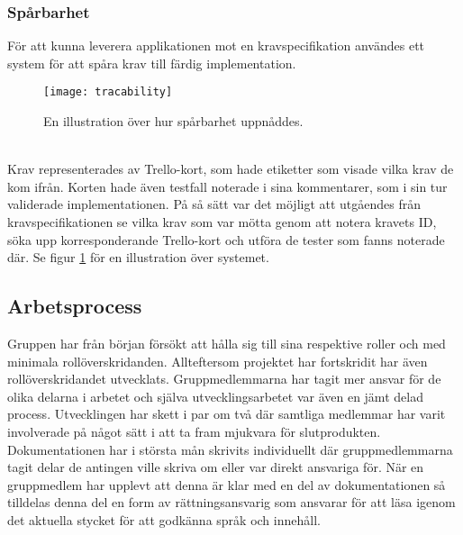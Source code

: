 \subsubsection{Spårbarhet}
För att kunna leverera applikationen mot en kravspecifikation
användes ett system för att spåra krav till färdig implementation.

\begin{figure}[h]
\centering
\texttt{[image: tracability]}
\caption{En illustration över hur spårbarhet uppnåddes.}
\label{fig:tracability}
\end{figure}
\ \\
Krav representerades av Trello-kort, som hade etiketter som visade vilka
krav de kom ifrån. Korten hade även testfall noterade i sina kommentarer, som i sin tur
validerade implementationen. På så sätt var det möjligt att utgåendes från kravspecifikationen se
vilka krav som var mötta genom att notera kravets ID, söka upp korresponderande Trello-kort och utföra
de tester som fanns noterade där. Se figur \ref{fig:tracability} för en illustration över systemet.

\subsection{Arbetsprocess}
Gruppen har från början försökt att hålla sig till sina respektive roller och med minimala rollöverskridanden. Allteftersom projektet har fortskridit har även rollöverskridandet utvecklats. Gruppmedlemmarna har tagit mer ansvar för de olika delarna i arbetet och själva utvecklingsarbetet var även en jämt delad process. Utvecklingen har skett i par om två där samtliga medlemmar har varit involverade på något sätt i att ta fram mjukvara för slutprodukten. Dokumentationen har i största mån skrivits individuellt där gruppmedlemmarna tagit delar de antingen ville skriva om eller var direkt ansvariga för. När en gruppmedlem har upplevt att denna är klar med en del av dokumentationen så tilldelas denna del en form av rättningsansvarig som ansvarar för att läsa igenom det aktuella stycket för att godkänna språk och innehåll.